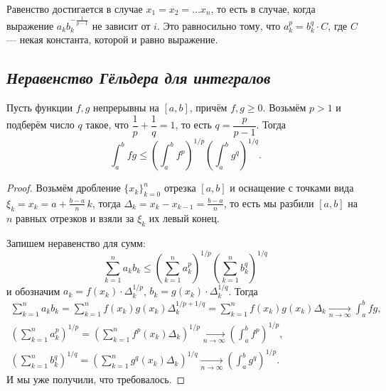 \begin{remark}
	Равенство достигается в случае \(x_1 = x_2 = \ldots x_n\), то есть в случае, когда выражение \(a_k b_k^{-\frac{1}{p - 1}}\) не зависит от \(i\). Это равносильно тому, что \(a_k^p = b_k^q \cdot C\), где \(C\) --- некая константа, которой и равно выражение. 
\end{remark}

\subsection{\itshape Неравенство Гёльдера для интегралов}

\begin{theorem}
	Пусть функции \(f, g\) непрерывны на  \([a, b]\), причём \(f, g \geqslant 0\). Возьмём \(p > 1\) и подберём число \(q\) такое, что \(\dfrac{1}{p} + \dfrac{1}{q} = 1\), то есть \(q = \dfrac{p}{p - 1}\). Тогда \[
	\int_a^b fg \leqslant \left(\int_{a}^{b} f^p \right)^{1/p} \left(\int_{a}^{b} g^q \right)^{1/q}.
	\]
\end{theorem}
\begin{proof}
	Возьмём дробление \(\{x_k\}_{k=0}^n\) отрезка  \([a, b]\) и оснащение с точками вида \(\xi_k = x_k = a + \frac{b - a}{n} \, k\), тогда \(\Delta_k = x_{k} - x_{k-1} = \frac{b - a}{n}\), то есть мы разбили \([a, b]\) на \(n\) равных отрезков и взяли за \(\xi_k\) их левый конец.
	
	Запишем неравенство для сумм:
	\begin{equation} \label{ГёльГёль}
		\sum_{k=1}^n a_k b_k \leqslant \left(\sum_{k=1}^{n} a_k^p \right)^{1/p} \left(\sum_{k=1}^{n} b_k^q \right)^{1/q}
	\end{equation}
	и обозначим \(a_k = f(x_k) \cdot \Delta_k^{1/p}\), \(b_k = g(x_k) \cdot \Delta_k^{1/q}\). Тогда
	\begin{gather*}
		\sum_{k=1}^n a_k b_k = \sum_{k=1}^n f(x_k) g(x_k) \Delta_k^{1/p + 1/q} = \sum_{k=1}^n f(x_k) g(x_k) \Delta_k \xrightarrow[n \to \infty]{} \int_a^b fg, \\
		\left(\sum_{k=1}^n a_k^p \right)^{1/p} = \left(\sum_{k=1}^n f^p(x_k) \Delta_k \right)^{1/p} \xrightarrow[n \to \infty]{} \left(\int_a^b f^p \right)^{1/p}, \\
		\left(\sum_{k=1}^n b_k^q \right)^{1/q} = \left(\sum_{k=1}^n g^q(x_k) \Delta_k \right)^{1/q} \xrightarrow[n \to \infty]{} \left(\int_a^b g^q\right)^{1/p}.
	\end{gather*}
	И мы уже получили, что требовалось.
\end{proof}

